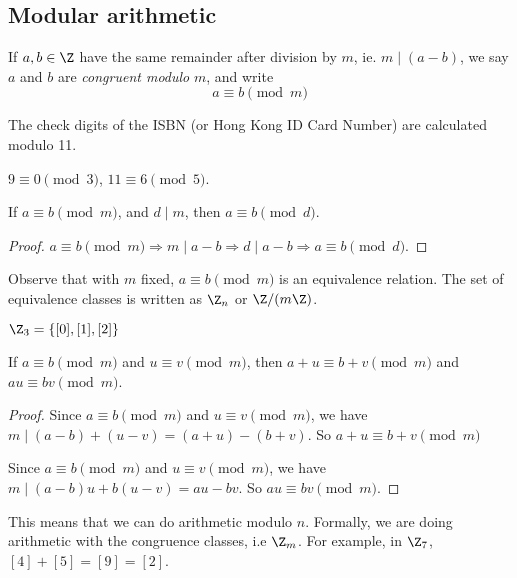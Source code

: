 \documentclass[a4paper]{article}
\begin{document}
\subsection{Modular arithmetic}
\begin{defi}[Modulo]
  If $a, b\in \Z$ have the same remainder after division by $m$, ie. $m \mid (a - b)$, we say $a$ and $b$ are \emph{congruent modulo} $m$, and write
  \[
    a\equiv b\pmod m
  \]
\end{defi}

\begin{eg}
  The check digits of the ISBN (or Hong Kong ID Card Number) are calculated modulo 11.
\end{eg}

\begin{eg}
  $9 \equiv 0\pmod 3$, $11\equiv 6\pmod 5$.
\end{eg}

\begin{prop}
  If $a\equiv b\pmod m$, and $d \mid m$, then $a \equiv b\pmod d$.
\end{prop}

\begin{proof}
  $a\equiv b\pmod m \Rightarrow m \mid a - b \Rightarrow d \mid a - b \Rightarrow a \equiv b\pmod d$.
\end{proof}

Observe that with $m$ fixed, $a\equiv b\pmod m$ is an equivalence relation. The set of equivalence classes is written as $\Z_n$ or $\Z/(m\Z)$.

\begin{eg}
  $\Z_3 = \{[0], [1], [2]\}$
\end{eg}

\begin{prop}
  If $a\equiv b\pmod m$ and $u\equiv v \pmod m$, then $a + u\equiv b + v\pmod m$ and $au \equiv bv \pmod m$.
\end{prop}

\begin{proof}
  Since $a\equiv b\pmod m$ and $u\equiv v \pmod m$, we have $m \mid (a - b) + (u - v) = (a + u) - (b + v)$. So $a + u\equiv b + v\pmod m$

  Since $a\equiv b\pmod m$ and $u\equiv v \pmod m$, we have $m \mid (a - b)u + b(u - v) = au - bv$. So $au \equiv bv \pmod m$.
\end{proof}

This means that we can do arithmetic modulo $n$. Formally, we are doing arithmetic with the congruence classes, i.e $\Z_m$. For example, in $\Z_7$, $[4] + [5] = [9] = [2]$.
\end{document}
